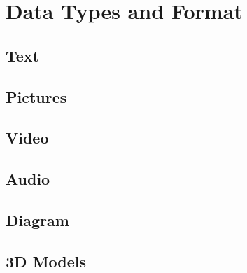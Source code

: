 \section{Data Types and Format}

\subsection{Text}

\subsection{Pictures}

\subsection{Video}

\subsection{Audio}

\subsection{Diagram}

\subsection{3D Models}



